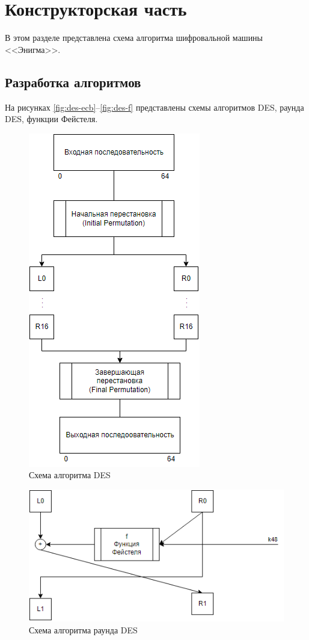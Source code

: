 \chapter{Конструкторская часть}

В этом разделе представлена схема алгоритма шифровальной машины <<Энигма>>.

\section{Разработка алгоритмов}

На рисунках \ref{fig:des-ecb}--\ref{fig:des-f} представлены схемы алгоритмов DES, раунда DES, функции Фейстеля.

\begin{figure}[ht!]
	\centering
	\includegraphics[width=0.4\linewidth]{img/des-al.png}
	\caption{Схема алгоритма DES}
	\label{fig:des-al}
\end{figure}

\begin{figure}[ht!]
	\centering
	\includegraphics[width=0.6\linewidth]{img/round.png}
	\caption{Схема алгоритма раунда DES}
	\label{fig:des-round}
\end{figure}

